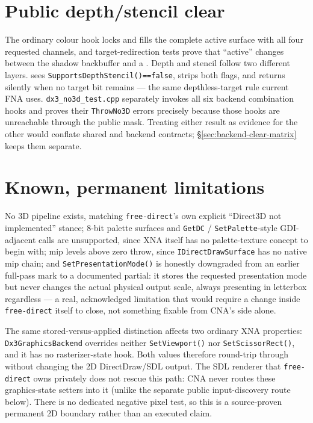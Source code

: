 \section{Public depth/stencil clear}

The ordinary colour hook locks and fills the complete active surface with all four requested
channels, and target-redirection tests prove that ``active'' changes between the shadow
backbuffer and a . Depth and stencil follow two different layers.
 sees \texttt{SupportsDepthStencil()==false}, strips both flags, and
returns silently when no target bit remains --- the same depthless-target rule current FNA
uses. \texttt{dx3\_no3d\_test.cpp} separately invokes all six backend combination hooks and
proves their \texttt{ThrowNo3D} errors precisely because those hooks are unreachable through
the public mask. Treating either result as evidence for the other would conflate shared and
backend contracts; \S\ref{sec:backend-clear-matrix} keeps them separate.

\section{Known, permanent limitations}

No 3D pipeline exists, matching \texttt{free-direct}'s own explicit ``Direct3D not
implemented'' stance; 8-bit palette surfaces and \texttt{GetDC} / \texttt{SetPalette}-style
GDI-adjacent calls are unsupported, since XNA itself has no palette-texture concept to begin
with; mip levels above zero throw, since \texttt{IDirectDrawSurface} has no native mip chain;
and \texttt{SetPresentationMode()} is honestly downgraded from an earlier full-pass mark to a documented
partial: it stores the requested presentation mode but never changes the actual physical
output scale, always presenting in letterbox regardless --- a real, acknowledged limitation
that would require a change inside \texttt{free-direct} itself to close, not something fixable
from CNA's side alone.

The same stored-versus-applied distinction affects two ordinary XNA properties:
\texttt{Dx3Graphics}\allowbreak\texttt{Backend} overrides neither \texttt{SetViewport()} nor
\texttt{SetScissorRect()}, and it has no rasterizer-state hook. Both values therefore
round-trip through  without changing the 2D DirectDraw/SDL output.
The SDL renderer that \texttt{free-direct} owns privately does not rescue this path: CNA never
routes these graphics-state setters into it (unlike the separate public input-discovery route
below). There is no dedicated negative pixel test, so this is a source-proven permanent 2D
boundary rather than an executed claim.

